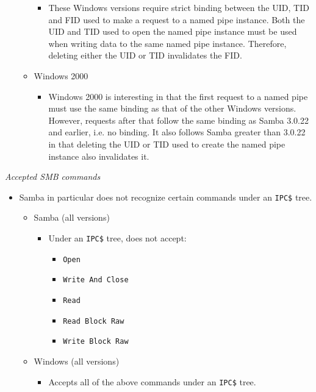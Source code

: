 \documentclass[english]{report}
\begin{document}
\begin{itemize}
\begin{itemize}
\begin{itemize}

\item[] These Windows versions require strict binding between the UID, TID and
FID used to make a request to a named pipe instance. Both the UID and TID used
to open the named pipe instance must be used when writing data to the same
named pipe instance. Therefore, deleting either the UID or TID invalidates the
FID.

\end{itemize}

\item[] Windows 2000

\begin{itemize}

\item[] Windows 2000 is interesting in that the first request to a named pipe
must use the same binding as that of the other Windows versions. However,
requests after that follow the same binding as Samba 3.0.22 and earlier, i.e.
no binding. It also follows Samba greater than 3.0.22 in that deleting the UID
or TID used to create the named pipe instance also invalidates it.

\end{itemize}
\end{itemize}
\end{itemize}

\textit{Accepted SMB commands}
\begin{itemize}

\item[] Samba in particular does not recognize certain commands under an
\texttt{IPC\$} tree.
\begin{itemize}
\item[] Samba (all versions)
\begin{itemize}
\item[] Under an \texttt{IPC\$} tree, does not accept:
\begin{itemize}
\item[] \texttt{Open}
\item[] \texttt{Write And Close}
\item[] \texttt{Read}
\item[] \texttt{Read Block Raw}
\item[] \texttt{Write Block Raw}
\end{itemize}
\end{itemize}

\item[] Windows (all versions)
\begin{itemize}

\item[] Accepts all of the above commands under an \texttt{IPC\$} tree.
\end{itemize}
\end{itemize}
\end{itemize}
\end{document}
